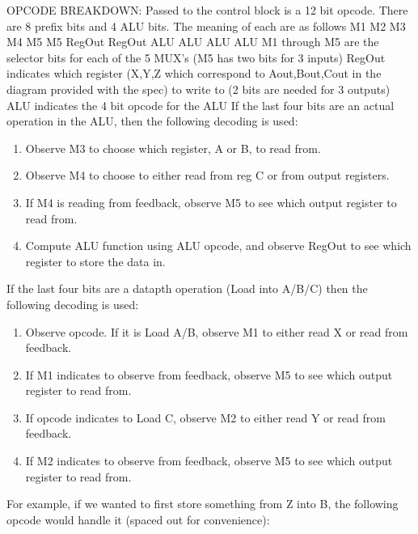 \documentclass[12pt]{article}
\begin{document}
OPCODE BREAKDOWN:
\newline \newline
Passed to the control block is a 12 bit opcode. There are 8 prefix bits and 4 ALU bits.
The meaning of each are as follows
\newline \newline
M1  M2  M3  M4  M5  M5  RegOut RegOut ALU ALU ALU ALU
\newline \newline
M1 through M5 are the selector bits for each of the 5 MUX's (M5 has two bits for 3 inputs)
\newline \newline
RegOut indicates which register (X,Y,Z which correspond to Aout,Bout,Cout in the diagram provided with the spec) to write to (2 bits are needed for 3 outputs)
\newline \newline
ALU indicates the 4 bit opcode for the ALU
\newline \newline
If the last four bits are an actual operation in the ALU, then the following decoding is used:
\begin{enumerate}
	\item Observe M3 to choose which register, A or B, to read from.
	\item Observe M4 to choose to either read from reg C or from output registers.
	\item If M4 is reading from feedback, observe M5 to see which output register to read from.
	\item Compute ALU function using ALU opcode, and observe RegOut to see which register to store the data in.
\end{enumerate}
If the last four bits are a datapth operation (Load into A/B/C) then the following decoding is used:
\begin{enumerate}
	\item Observe opcode. If it is Load A/B, observe M1 to either read X or read from feedback.
	\item If M1 indicates to observe from feedback, observe M5 to see which output register to read from.
	\item If opcode indicates to Load C, observe M2 to either read Y or read from feedback.
	\item If M2 indicates to observe from feedback, observe M5 to see which output register to read from.
\end{enumerate}
For example, if we wanted to first store something from Z into B, the following opcode would handle it (spaced out for convenience):
\end{document}

